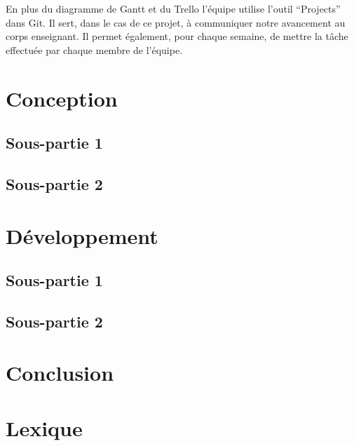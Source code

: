 \documentclass[a4paper,12pt]{article}
\begin{document}
En plus du diagramme de Gantt et du Trello l’équipe utilise l’outil “Projects” dans Git. Il sert, dans le cas de ce projet, à communiquer notre avancement au corps enseignant. Il permet également, pour chaque semaine, de mettre la tâche effectuée par chaque membre de l’équipe.



\section{Conception}

\subsection{Sous-partie 1}

\subsection{Sous-partie 2}



\section{Développement}

\subsection{Sous-partie 1}

\subsection{Sous-partie 2}



\section{Conclusion}



\newpage
\appendix

\section{Lexique}
\end{document}
